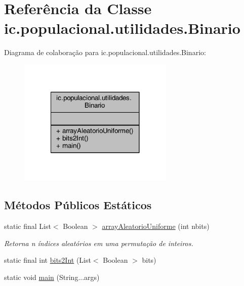 \hypertarget{classic_1_1populacional_1_1utilidades_1_1_binario}{\section{Referência da Classe ic.\-populacional.\-utilidades.\-Binario}
\label{classic_1_1populacional_1_1utilidades_1_1_binario}
}


Diagrama de colaboração para ic.\-populacional.\-utilidades.\-Binario\-:\nopagebreak
\begin{figure}[H]
\begin{center}
\leavevmode
\includegraphics[width=210pt]{classic_1_1populacional_1_1utilidades_1_1_binario__coll__graph}
\end{center}
\end{figure}
\subsection*{Métodos Públicos Estáticos}
\begin{DoxyCompactItemize}
\item 
static final List$<$ Boolean $>$ \hyperlink{classic_1_1populacional_1_1utilidades_1_1_binario_a2ee67758516b8b1a9a3a2def3925f52c}{array\-Aleatorio\-Uniforme} (int nbits)
\begin{DoxyCompactList}\small\item\em Retorna n índices aleatórios em uma permutação de inteiros. \end{DoxyCompactList}\item 
static final int \hyperlink{classic_1_1populacional_1_1utilidades_1_1_binario_acbadb46434856fd58bbe1d9dbfd5447c}{bits2\-Int} (List$<$ Boolean $>$ bits)
\item 
static void \hyperlink{classic_1_1populacional_1_1utilidades_1_1_binario_abd5219bf86018207e870767f7facc6a0}{main} (String...\-args)
\end{DoxyCompactItemize}



